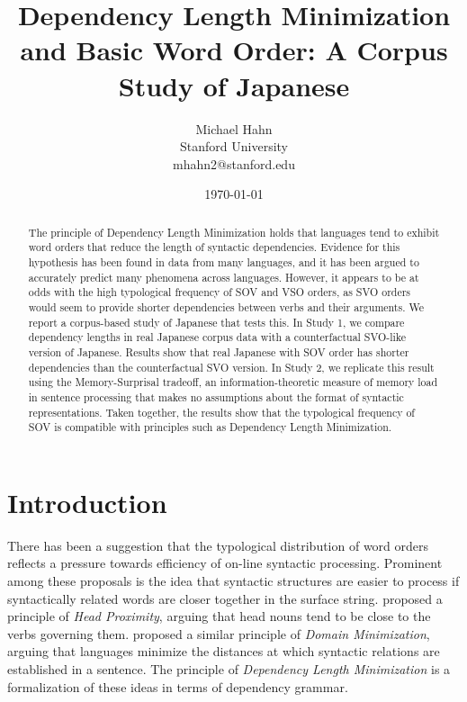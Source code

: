 \documentclass[11pt,a4paper]{article}
\title{Dependency Length Minimization and Basic Word Order: A Corpus Study of Japanese}
\author{Michael Hahn \\ Stanford University \\ mhahn2@stanford.edu}
\date{\today}
\begin{document}
\maketitle
\begin{abstract}
The principle of Dependency Length Minimization holds that languages tend to exhibit word orders that reduce the length of syntactic dependencies.
Evidence for this hypothesis has been found in data from many languages, and it has been argued to accurately predict many phenomena across languages.
However, it appears to be at odds with the high typological frequency of SOV and VSO orders, as SVO orders would seem to provide shorter dependencies between verbs and their arguments.
We report a corpus-based study of Japanese that tests this.
In Study 1, we compare dependency lengths in real Japanese corpus data with a counterfactual SVO-like version of Japanese.
Results show that real Japanese with SOV order has shorter dependencies than the counterfactual SVO version.
In Study 2, we replicate this result using the Memory-Surprisal tradeoff, an information-theoretic measure of memory load in sentence processing that makes no assumptions about the format of syntactic representations. 
Taken together, the results show that the typological frequency of SOV is compatible with principles such as Dependency Length Minimization.
\end{abstract}


\section{Introduction}

There has been a suggestion that the typological distribution of word orders reflects a pressure towards efficiency of on-line syntactic processing.
Prominent among these proposals is the idea that syntactic structures are easier to process if syntactically related words are closer together in the surface string.
\cite{rijkhoff-word-1986} proposed a principle of \emph{Head Proximity}, arguing that head nouns tend to be close to the verbs governing them.
\cite{hawkins2014crosslinguistic} proposed a similar principle of \emph{Domain Minimization}, arguing that languages minimize the distances at which syntactic relations are established in a sentence.
The principle of \emph{Dependency Length Minimization} \citep{temperley2018minimizing} is a formalization of these ideas in terms of dependency grammar.
\end{document}
